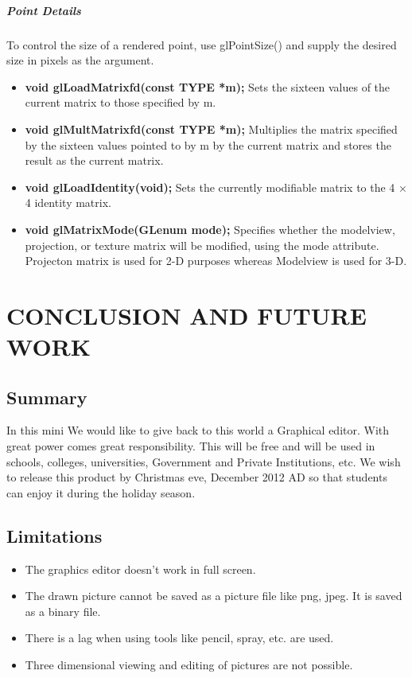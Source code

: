 \documentclass[12pt]{report}
\begin{document}
\paragraph{\textbf{Point Details} } 
To control the size of a rendered point, use glPointSize() and supply the desired size in pixels as the argument.
\begin{itemize}
\item{}	\textbf{void glLoadMatrix{fd}(const TYPE *m);}
Sets the sixteen values of the current matrix to those specified by m.

\item{}	\textbf{void glMultMatrix{fd}(const TYPE *m);}
Multiplies the matrix specified by the sixteen values pointed to by m by the current matrix and stores the result as the current matrix.

\item{}	\textbf{void glLoadIdentity(void);}
Sets the currently modifiable matrix to the 4 × 4 identity matrix.

\item{}	\textbf{void glMatrixMode(GLenum mode);}
Specifies whether the modelview, projection, or texture matrix will be modified, using the mode attribute. Projecton matrix is used for 2-D purposes whereas Modelview is used for 3-D.

\end{itemize}

\pagestyle{fancy}
\chead{}
\rfoot{\small{\thepage}}
\renewcommand{\headrulewidth}{0.4pt}
\renewcommand{\footrulewidth}{0.4pt}
\chapter{CONCLUSION AND FUTURE WORK}

\section{Summary}
In this mini
We would like to give back to this world a Graphical editor. With great power comes great responsibility. This will be free and will be used in schools, colleges, universities, Government and Private Institutions, etc. We wish to release this product by Christmas eve, December 2012 AD so that students can enjoy it during the holiday season.

\section{Limitations}
\begin{itemize}
\item{}The graphics editor doesn't work in full screen.
\item{} The drawn picture cannot be saved as a picture file like png, jpeg. It is saved as  a binary file.
\item{}	There is a lag when using tools like pencil, spray, etc. are used.
\item{}	Three dimensional viewing and editing of pictures are not possible. 
\end{itemize}
\end{document}
